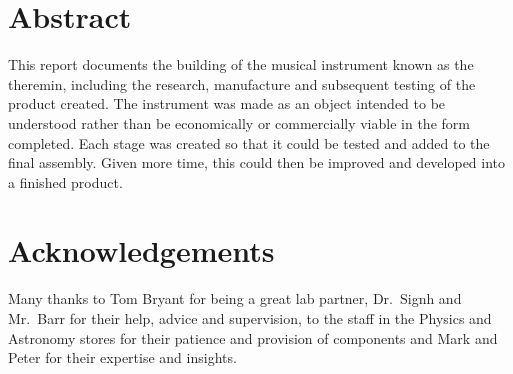 \section*{Abstract}
\thispagestyle{plain}

This report documents the building of the musical instrument known as the theremin, including the research, manufacture and subsequent testing of the product created. The instrument was made as an object intended to be understood rather than be economically or commercially viable in the form completed. Each stage was created so that it could be tested and added to the final assembly. Given more time, this could then be improved and developed into a finished product.

\vfill

\section*{Acknowledgements}
Many thanks to Tom Bryant for being a great lab partner, Dr.\ Signh and Mr.\ Barr for their help, advice and supervision, to the staff in the Physics and Astronomy stores for their patience and provision of components and Mark and Peter for their expertise and insights.
